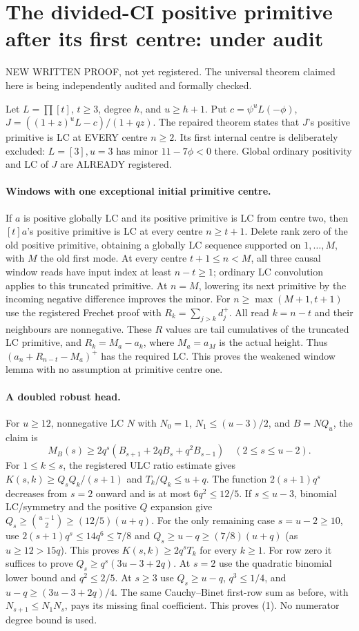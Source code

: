 \section{The divided-CI positive primitive after its first centre: under audit}
NEW WRITTEN PROOF, not yet registered. The universal theorem claimed
here is being independently audited and formally checked.

Let $L=\prod[t]$, $t\ge3$, degree $h$, and $u\ge h+1$.
Put $c=\psi^uL(-\phi)$, $J=((1+z)^uL-c)/(1+qz)$.
The repaired theorem states that $J$'s positive primitive is LC at
EVERY centre $n\ge2$. Its first internal centre is deliberately
excluded: $L=[3],u=3$ has minor $11-7\phi<0$ there.
Global ordinary positivity and LC of $J$ are ALREADY registered.

\paragraph{Windows with one exceptional initial primitive centre.}
If $a$ is positive globally LC and its positive primitive is LC from
centre two, then $[t]a$'s positive primitive is LC at every centre
$n\ge t+1$. Delete rank zero of the old positive primitive, obtaining
a globally LC sequence supported on $1,\ldots,M$, with $M$ the old
first mode. At every centre $t+1\le n<M$, all three causal window
reads have input index at least $n-t\ge1$; ordinary LC convolution
applies to this truncated primitive. At $n=M$, lowering its next
primitive by the incoming negative difference improves the minor.
For $n\ge\max(M+1,t+1)$ use the registered Frechet proof with
$R_k=\sum_{j>k}d_j^+$. All read $k=n-t$ and their neighbours are
nonnegative. These $R$ values are tail cumulatives of the truncated
LC primitive, and $R_k=M_a-a_k$, where $M_a=a_M$ is the actual height.
Thus $(a_n+R_{n-t}-M_a)^+$ has the required LC. This proves the
weakened window lemma with no assumption at primitive centre one.

\paragraph{A doubled robust head.}
For $u\ge12$, nonnegative LC $N$ with $N_0=1$,
$N_1\le(u-3)/2$, and $B=NQ_u$, the claim is
\[
 M_B(s)\ge2q^s(B_{s+1}+2qB_s+q^2B_{s-1})
                                \quad(2\le s\le u-2). \tag{1}
\]
For $1\le k\le s$, the registered ULC ratio estimate gives
$K(s,k)\ge Q_sQ_k/(s+1)$ and $T_k/Q_k\le u+q$.
The function $2(s+1)q^s$ decreases from $s=2$ onward and is at most
$6q^2\le12/5$. If $s\le u-3$, binomial LC/symmetry and the positive
$Q$ expansion give $Q_s\ge{u-1\choose2}\ge(12/5)(u+q)$.
For the only remaining case $s=u-2\ge10$, use
$2(s+1)q^s\le14q^6\le7/8$ and
$Q_s\ge u-q\ge(7/8)(u+q)$ (as $u\ge12>15q$).
This proves $K(s,k)\ge2q^sT_k$ for every $k\ge1$.
For row zero it suffices to prove
$Q_s\ge q^s(3u-3+2q)$. At $s=2$ use the quadratic binomial lower
bound and $q^2\le2/5$. At $s\ge3$ use $Q_s\ge u-q$, $q^3\le1/4$,
and $u-q\ge(3u-3+2q)/4$. The same Cauchy--Binet first-row sum as
before, with $N_{s+1}\le N_1N_s$, pays its missing final coefficient.
This proves (1). No numerator degree bound is used.

